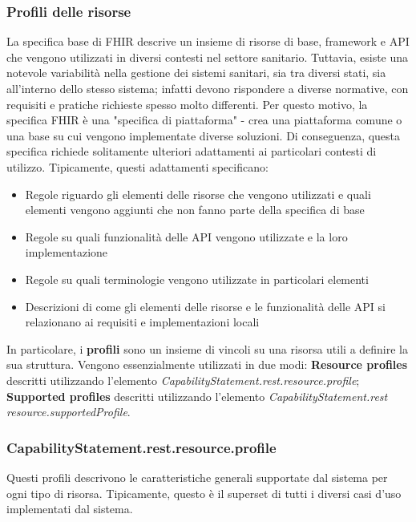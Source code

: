 \documentclass[a4paper]{article}
\begin{document}
\subsubsection*{Profili delle risorse}
La specifica base di FHIR descrive un insieme di risorse di base, framework e API che vengono utilizzati in diversi contesti nel settore sanitario. Tuttavia, esiste una notevole variabilità nella gestione dei sistemi sanitari, sia tra diversi stati, sia all'interno dello stesso sistema; infatti devono rispondere a diverse normative, con requisiti e pratiche richieste spesso molto differenti.
Per questo motivo, la specifica FHIR è una "specifica di piattaforma" - crea una piattaforma comune o una base su cui vengono implementate diverse soluzioni. Di conseguenza, questa specifica richiede solitamente ulteriori adattamenti ai particolari contesti di utilizzo. Tipicamente, questi adattamenti specificano:
\begin{itemize}
    \item Regole riguardo gli elementi delle risorse che vengono utilizzati e quali elementi vengono aggiunti che non fanno parte della specifica di base
    \item Regole su quali funzionalità delle API vengono utilizzate e la loro implementazione
    \item Regole su quali terminologie vengono utilizzate in particolari elementi
    \item Descrizioni di come gli elementi delle risorse e le funzionalità delle API si  relazionano ai requisiti e implementazioni locali
\end{itemize}
In particolare, i \textbf{profili} sono un insieme di vincoli su una risorsa utili a definire la sua struttura.
Vengono essenzialmente utilizzati in due modi:
\textbf{Resource profiles} descritti utilizzando l'elemento \textit{CapabilityStatement.rest.resource.profile};
\textbf{Supported profiles} descritti utilizzando l'elemento \textit{CapabilityStatement.rest resource.supportedProfile}.
\subsubsection*{CapabilityStatement.rest.resource.profile}
Questi profili descrivono le caratteristiche generali supportate dal sistema per ogni tipo di risorsa.
Tipicamente, questo è il superset di tutti i diversi casi d'uso implementati dal sistema.
\end{document}
